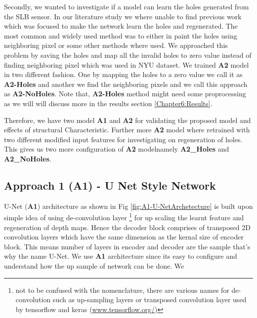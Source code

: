 Secondly, we wanted to investigate if a model can learn the holes generated from the SLB sensor. In our literature study we where unable to find previous work which was focused to make the network learn the holes and regenerated. The most common and widely used method was to either in paint the holes using neighboring pixel \cite{silberman11indoor} or some other methods where used. We approached this problem by saving the holes and map all the invalid holes to zero value instead of finding neighboring pixel which was used in NYU dataset. We trained \textbf{A2} model in two different fashion. One by mapping the holes to a zero value we call it as \textbf{A2-Holes} and another we find the neighboring pixels and we call this approach as \textbf{A2-NoHoles}. Note that, \textbf{A2-Holes} method might need some proprocessing as we will will discuss more in the results section \ref{Chapter6:Results}.

Therefore, we have two model \textbf{A1} and \textbf{A2} for validating the proposed model and effects of structural Characteristic. Further more \textbf{A2} model where retrained with two different modified input features for investigating on regeneration of holes. This gives us two more configuration of \textbf{A2} modelnamely \textbf{A2\_Holes} and \textbf{A2\_NoHoles}. 








\subsection{Approach 1 (A1) - U Net Style Network}
U-Net (\textbf{A1}) architecture as shown in Fig \ref{fig:A1-U-NetArchetecture} is built upon simple idea of using de-convolution layer  \footnote{not to be confused with the nomenclature, there are various names for de-convolution such as up-sampling layers or transposed convolution layer used by tensorflow and keras (\url{www.tensorflow.org/})} for up scaling the learnt feature and regeneration of depth maps. Hence the decoder block comprises of transposed 2D convolution layers which have the same dimension as the kernal size of encoder block. This means number of layers in encoder and decoder are the sample that's why the name U-Net. We use \textbf{A1} architecture since its easy to configure and understand how the up sample of network can be done. We 

